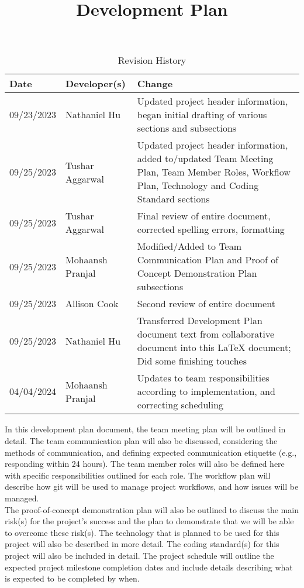 \documentclass{article}
\title{Development Plan \\\progname}
\author{\authname}
\date{}
\begin{document}
\maketitle

\begin{table}[hp]
\caption{Revision History} \label{TblRevisionHistory}
\begin{tabularx}{\textwidth}{llX}
\toprule
\textbf{Date} & \textbf{Developer(s)} & \textbf{Change}\\
\midrule
09/23/2023 & Nathaniel Hu & Updated project header information, began initial drafting of various sections and subsections \\
09/25/2023  & Tushar Aggarwal & Updated project header information, added to/updated Team Meeting Plan, Team Member Roles, Workflow Plan, Technology and Coding Standard sections \\
09/25/2023 & Tushar Aggarwal & Final review of entire document, corrected spelling errors, formatting \\
09/25/2023 & Mohaansh Pranjal & Modified/Added to Team Communication Plan and Proof of Concept Demonstration Plan subsections \\
09/25/2023 & Allison Cook & Second review of entire document \\
09/25/2023 & Nathaniel Hu & Transferred Development Plan document text from collaborative document into this LaTeX document; Did some finishing touches \\
04/04/2024 & Mohaansh Pranjal & Updates to team responsibilities according to implementation, and correcting scheduling \\
\bottomrule
\end{tabularx}
\end{table}

\noindent In this development plan document, the team meeting plan will be outlined in detail. The team communication plan will also be discussed, considering the methods of communication, and defining expected communication etiquette (e.g., responding within 24 hours). The team member roles will also be defined here with specific responsibilities outlined for each role. The workflow plan will describe how git will be used to manage project workflows, and how issues will be managed. \\

\noindent The proof-of-concept demonstration plan will also be outlined to discuss the main risk(s) for the project’s success and the plan to demonstrate that we will be able to overcome these risk(s). The technology that is planned to be used for this project will also be described in more detail. The coding standard(s) for this project will also be included in detail. The project schedule will outline the expected project milestone completion dates and include details describing what is expected to be completed by when.
\end{document}
